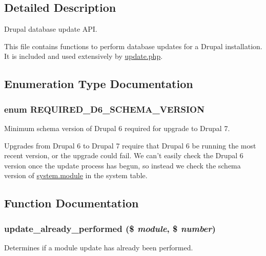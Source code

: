 \subsection{Detailed Description}
Drupal database update API.

This file contains functions to perform database updates for a Drupal installation. It is included and used extensively by \hyperlink{update_8php}{update.php}. 

\subsection{Enumeration Type Documentation}
\hypertarget{update_8inc_acba191c88d6f0e38bec3a5f873f57108}{
\subsubsection[{REQUIRED\_\-D6\_\-SCHEMA\_\-VERSION}]{\setlength{\rightskip}{0pt plus 5cm}enum {\bf REQUIRED\_\-D6\_\-SCHEMA\_\-VERSION}}}
\label{update_8inc_acba191c88d6f0e38bec3a5f873f57108}
Minimum schema version of Drupal 6 required for upgrade to Drupal 7.

Upgrades from Drupal 6 to Drupal 7 require that Drupal 6 be running the most recent version, or the upgrade could fail. We can't easily check the Drupal 6 version once the update process has begun, so instead we check the schema version of \hyperlink{system_8module}{system.module} in the system table. 

\subsection{Function Documentation}
\hypertarget{update_8inc_a6ccab16044efda416011fc20367d9344}{
\subsubsection[{update\_\-already\_\-performed}]{\setlength{\rightskip}{0pt plus 5cm}update\_\-already\_\-performed (\$ {\em module}, \/  \$ {\em number})}}
\label{update_8inc_a6ccab16044efda416011fc20367d9344}
Determines if a module update has already been performed.


